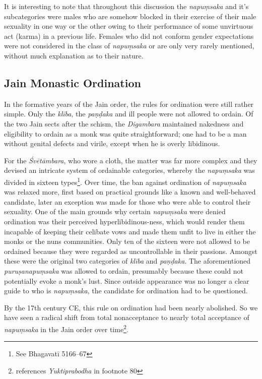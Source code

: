 It is interesting to note that throughout this discussion the {\em napuṃsaka} and it's subcategories were males who are somehow blocked in their exercise of their male sexuality in one way or the other owing to their performance of some unvirtuous act (karma) in a previous life. Females who did not conform gender expectations were not considered in the class of {\em napuṃsaka} or are only very rarely mentioned, without much explanation as to their nature. 

\subsection{Jain Monastic Ordination}
In the formative years of the Jain order, the rules for ordination were still rather simple. Only the {\em klība}, the {\em paṇḍaka} and ill people were not allowed to ordain. Of the two Jain sects after the schism, the {\em Digambara} maintained nakedness and eligibility to ordain as a monk was quite straightforward; one had to be a man without genital defects and virile, except when he is overly libidinous. 

For the {\em Śvētāmbara}, who wore a cloth, the matter was far more complex and they devised an intricate system of ordainable categories, whereby the {\em napuṃsaka} was divided in sixteen types\footnote{See Bhagavatī 5166–67}. Over time, the ban against ordination of {\em napuṃsaka} was relaxed more, first based on practical grounds like a known and well-behaved candidate, later an exception was made for those who were able to control their sexuality. One of the main grounds why certain {\em napuṃsaka} were denied ordination was their perceived hyperlibidinous-ness, which would render them incapable of keeping their celibate vows and made them unfit to live in either the monks or the nuns communities. Only ten of the sixteen were not allowed to be ordained because they were regarded as uncontrollable in their passions. Amongst these were the original two categories of {\em klība} and {\em paṇḍaka}. The aforementioned {\em puruṣanapuṃsaka} was allowed to ordain, presumably because these could not potentially evoke a monk's lust. Since outside appearance was no longer a clear guide to who is {\em napuṃsaka}, the candidate for ordination had to be questioned. 

By the 17th century CE, this rule on ordination had been nearly abolished. So we have seen a radical shift from total nonacceptance to nearly total acceptance of {\em napuṃsaka} in the Jain order over time\footnote{\cite{zwilling} references {\em Yuktiprabodha} in footnote 80}.


